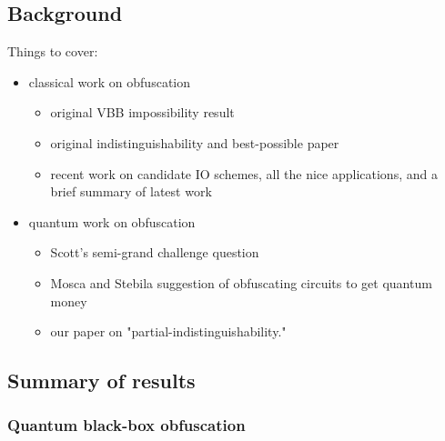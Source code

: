 \documentclass[11pt]{article}
\numberwithin{equation}{section}
\begin{document}
\subsection{Background}

Things to cover:

\begin{itemize}
\item classical work on obfuscation
\begin{itemize}
\item original VBB impossibility result
\item original indistinguishability and best-possible paper
\item recent work on candidate IO schemes, all the nice applications, and a brief summary of latest work 
\end{itemize}
\item quantum work on obfuscation
\begin{itemize}
\item Scott's semi-grand challenge question
\item Mosca and Stebila suggestion of obfuscating circuits to get quantum money
\item our paper on "partial-indistinguishability."
\end{itemize}
\end{itemize}

\subsection{Summary of results}

\subsubsection{Quantum black-box obfuscation}
\end{document}
